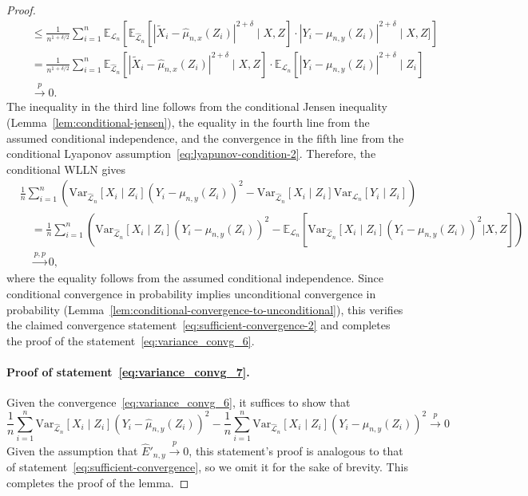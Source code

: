 \documentclass[12pt]{article}
\theoremstyle{definition}
\theoremstyle{remark}
\newcommand{\E}{\mathbb E}								%
\newcommand{\V}{\mathrm{Var}}							%
\newcommand{\convp}{\overset p \rightarrow}             %
\newcommand{\srx}{X}									%
\newcommand{\srz}{Z}									%
\newcommand{\srxk}{\widetilde X}						%
\newcommand{\sry}{Y}									%
\newcommand{\law}{\mathcal L}							%
\newcommand{\lawhat}{\widehat{\mathcal L}}				%
\newcommand{\convpp}{\overset {p,p} \longrightarrow}    %
\begin{document}
\begin{proof}
\begin{align*}
		&\quad\leq \frac{1}{n^{1+\delta/2}} \sum_{i = 1}^n \E_{\law_n}\left[\E_{\lawhat_n}[|\srxk_i-\widehat{\mu}_{n,x}(Z_i)|^{2+\delta} \mid \srx, \srz] \cdot |\sry_i-\mu_{n,y}(Z_i)|^{2+\delta} \mid \srx,\srz]\right]\\
		&\quad= \frac{1}{n^{1+\delta/2}} \sum_{i = 1}^n \E_{\lawhat_n}[|\srxk_i-\widehat\mu_{n,x}(Z_i)|^{2+\delta}\mid \srx, \srz] \cdot \E_{\law_n}\left[|\sry_i-\mu_{n,y}(Z_i)|^{2+\delta} \mid Z_i\right]\\
		&\quad\convp 0. 
	\end{align*}
	The inequality in the third line follows from the conditional Jensen inequality (Lemma~\ref{lem:conditional-jensen}), the equality in the fourth line from the assumed conditional independence, and the convergence in the fifth line from the conditional Lyaponov assumption~\eqref{eq:lyapunov-condition-2}. Therefore, the conditional WLLN gives
	\begin{equation*}
	\begin{split}
	&\frac{1}{n} \sum_{i=1}^n \left(\V_{\lawhat_n}[\srx_i\mid \srz_i](\sry_i-\mu_{n,y}(\srz_i))^2- \V_{\lawhat_n}[\srx_i\mid \srz_i]\V_{\law_n}[\sry_i \mid \srz_i]\right) \\
	&\quad = \frac{1}{n} \sum_{i=1}^n \left(\V_{\lawhat_n}[\srx_i\mid \srz_i](\sry_i-\mu_{n,y}(\srz_i))^2- \E_{\law_n}[\V_{\lawhat_n}[\srx_i\mid \srz_i](\sry_i-\mu_{n,y}(\srz_i))^2 | \srx, \srz]\right) \\
	&\quad \convpp 0,
	\end{split}
	\end{equation*}
	where the equality follows from the assumed conditional independence. Since conditional convergence in probability implies unconditional convergence in probability (Lemma~\ref{lem:conditional-convergence-to-unconditional}), this verifies the claimed convergence statement~\eqref{eq:sufficient-convergence-2} and completes the proof of the statement~\eqref{eq:variance_convg_6}.

\paragraph{Proof of statement~\eqref{eq:variance_convg_7}.} 

Given the convergence~\eqref{eq:variance_convg_6}, it suffices to show that
\begin{equation}
\frac{1}{n}\sum_{i=1}^n \V_{\lawhat_n}[\srx_i\mid \srz_i](\sry_i-\widehat \mu_{n,y}(\srz_i))^2-\frac{1}{n}\sum_{i=1}^n \V_{\lawhat_n}[\srx_i\mid \srz_i](\sry_i-\mu_{n,y}(\srz_i))^2
\convp 0
\end{equation}
Given the assumption that $\widehat E'_{n,y} \convp 0$, this statement's proof is analogous to that of statement~\eqref{eq:sufficient-convergence}, so we omit it for the sake of brevity. This completes the proof of the lemma.
\end{proof}
\end{document}
